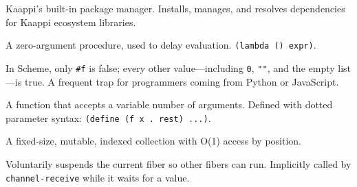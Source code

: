 \begin{description}[leftmargin=2em, style=nextline]
\item[thottam]
Kaappi's built-in package manager. Installs, manages, and resolves dependencies for Kaappi ecosystem libraries.

\item[thunk]
A zero-argument procedure, used to delay evaluation. \texttt{(lambda () expr)}.

\item[truthiness]
In Scheme, only \texttt{\#f} is false; every other value---including \texttt{0}, \texttt{""}, and the empty list---is true. A frequent trap for programmers coming from Python or JavaScript.

\item[variadic]
A function that accepts a variable number of arguments. Defined with dotted parameter syntax: \texttt{(define (f x . rest) ...)}.

\item[vector]
A fixed-size, mutable, indexed collection with O(1) access by position.

\item[yield]
Voluntarily suspends the current fiber so other fibers can run. Implicitly called by \texttt{channel-receive} while it waits for a value.

\end{description}
